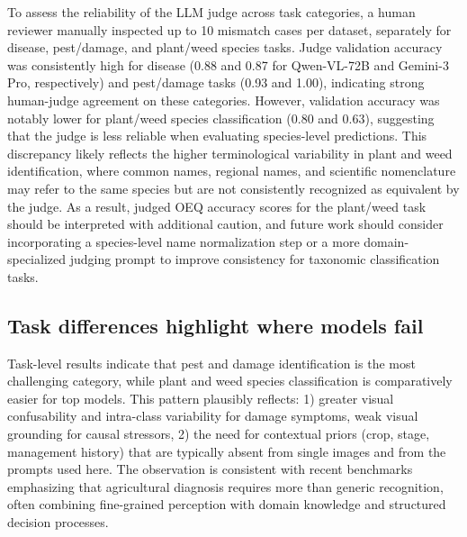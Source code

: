 \documentclass[10pt,letterpaper]{article}
\begin{document}
To assess the reliability of the LLM judge across task categories, a human reviewer manually inspected up to 10 mismatch cases per dataset, separately for disease, pest/damage, and plant/weed species tasks. Judge validation accuracy was consistently high for disease (0.88 and 0.87 for Qwen-VL-72B and Gemini-3 Pro, respectively) and pest/damage tasks (0.93 and 1.00), indicating strong human-judge agreement on these categories. However, validation accuracy was notably lower for plant/weed species classification (0.80 and 0.63), suggesting that the judge is less reliable when evaluating species-level predictions. This discrepancy likely reflects the higher terminological variability in plant and weed identification, where common names, regional names, and scientific nomenclature may refer to the same species but are not consistently recognized as equivalent by the judge. As a result, judged OEQ accuracy scores for the plant/weed task should be interpreted with additional caution, and future work should consider incorporating a species-level name normalization step or a more domain-specialized judging prompt to improve consistency for taxonomic classification tasks.

\subsection{Task differences highlight where models fail}
Task-level results indicate that pest and damage identification is the most challenging category, while plant and weed species classification is comparatively easier for top models. This pattern plausibly reflects: 1) greater visual confusability and intra-class variability for damage symptoms, weak visual grounding for causal stressors, 2) the need for contextual priors (crop, stage, management history) that are typically absent from single images and from the prompts used here. The observation is consistent with recent benchmarks emphasizing that agricultural diagnosis requires more than generic recognition, often combining fine-grained perception with domain knowledge and structured decision processes.
\end{document}
